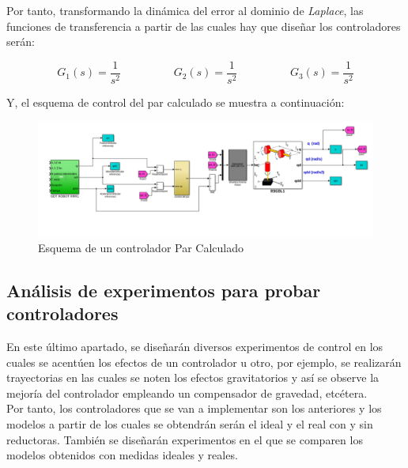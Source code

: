 Por tanto, transformando la dinámica del error al dominio de \textit{Laplace}, las funciones de transferencia a partir de las cuales hay que diseñar los controladores serán:

\begin{equation}
G_{1}(s)=\frac{1}{s^{2}} \hspace{2cm} G_{2}(s)=\frac{1}{s^{2}} \hspace{2cm} G_{3}(s)=\frac{1}{s^{2}}
\end{equation}



Y, el esquema de control del par calculado se muestra a continuación:



\begin{figure}[h!]

	\centering

	\includegraphics[width=.8\textwidth]{montaje_parcalcul}

	\caption{Esquema de un controlador Par Calculado}

\end{figure}



\newpage

\subsection{Análisis de experimentos para probar controladores}

En este último apartado, se diseñarán diversos experimentos de control en los cuales se acentúen los efectos de un controlador u otro, por ejemplo, se realizarán trayectorias en las cuales se noten los efectos gravitatorios y así se observe la mejoría del controlador empleando un compensador de gravedad, etcétera.\\

Por tanto, los controladores que se van a implementar son los anteriores y los modelos a partir de los cuales se obtendrán serán el ideal y el real con y sin reductoras. También se diseñarán experimentos en el que se comparen los modelos obtenidos con medidas ideales y reales.\\



